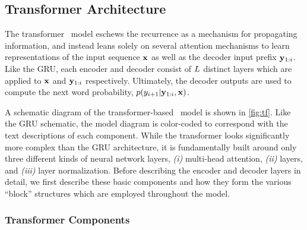 \subsection{Transformer Architecture}
\label{sec:nlgtf}




The transformer \sequencetosequence~model eschews the recurrence as a mechanism
for propagating information, and instead leans solely on several 
attention mechanisms to learn representations of the input sequence $\mathbf{x}$
as well as the decoder input prefix $\mathbf{y}_{1:i}$. Like the GRU,
each encoder and decoder consist of $L$ distinct
layers which are applied to $\mathbf{x}$ and $\mathbf{y}_{1:i}$ respectively.
Ultimately,
the decoder outputs are used to compute the next word probability,
$p(y_{i+1}|\mathbf{y}_{1:i},\mathbf{x})$. 

A schematic diagram of the transformer-based \sequencetosequence~model
is shown in \autoref{fig:tf}. Like the GRU schematic, the model diagram is 
color-coded to correspond with the text descriptions of each component.
While the transformer looks significantly more complex than the 
GRU architecture, it is fundamentally built around only three 
different kinds of 
neural network layers, \textit{(i)} multi-head attention, 
\textit{(ii)} \feedforward layers, and \textit{(iii)} 
layer normalization. Before describing the encoder and decoder layers
in detail, we first describe these basic components and how they form 
the various ``block'' structures which are employed throughout the model.

\subsubsection{Transformer Components}

